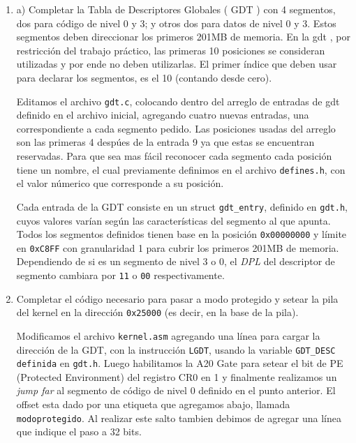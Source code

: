 \documentclass[a4paper]{article}
\begin{document}
\begin{enumerate}[label=\alph*)]
	
\item a) Completar la Tabla de Descriptores Globales (
GDT )
con
4
segmentos, dos para código de nivel
0 y 3; y otros dos para datos de nivel 0 y 3. Estos segmentos deben direccionar los primeros
201MB de memoria. En la
gdt ,
por restricción del trabajo práctico, las primeras
10
posiciones
se consideran utilizadas y por ende no deben utilizarlas. El primer índice que deben usar para
declarar los segmentos, es el
10
(contando desde cero).

Editamos el archivo \texttt{gdt.c}, colocando dentro del arreglo de entradas de gdt definido en el archivo inicial, agregando cuatro nuevas entradas, una correspondiente a cada segmento pedido. Las posiciones usadas del arreglo son las primeras 4 desp\'ues de la entrada 9 ya que estas se encuentran reservadas. Para que sea mas f\'acil reconocer cada segmento cada posici\'on tiene un nombre, el cual previamente definimos en el archivo \texttt{defines.h}, con el valor n\'umerico que corresponde a su posici\'on.

Cada entrada de la GDT consiste en un struct \texttt{gdt\_entry}, definido en \texttt{gdt.h}, cuyos valores var\'ian seg\'un las caracter\'isticas del segmento al que apunta. Todos los segmentos definidos tienen base en la posici\'on \texttt{0x00000000} y l\'imite en \texttt{0xC8FF} con granularidad 1 para cubrir los primeros 201MB de memoria. Dependiendo de si es un segmento de nivel 3 o 0, el \textit{DPL} del descriptor de segmento cambiara por \texttt{11} o \texttt{00} respectivamente.

\item Completar el código necesario para pasar a modo protegido y setear la pila del kernel
en la dirección \texttt{0x25000} (es decir, en la base de la pila).

Modificamos el archivo \texttt{kernel.asm} agregando una l\'inea para cargar la direcci\'on de la GDT, con la instrucci\'on \texttt{LGDT}, usando la variable \texttt{GDT\_DESC definida} en \texttt{gdt.h}. Luego habilitamos la A20 Gate para setear el bit de PE (Protected Environment) del registro CR0 en 1 y finalmente realizamos un \textit{jump far} al segmento de c\'odigo de nivel 0 definido en el punto anterior. El offset esta dado por una etiqueta que agregamos abajo, llamada \texttt{modoprotegido}. Al realizar este salto  tambien debimos de agregar una l\'inea que indique el paso a 32 bits.


\end{enumerate}
\end{document}
